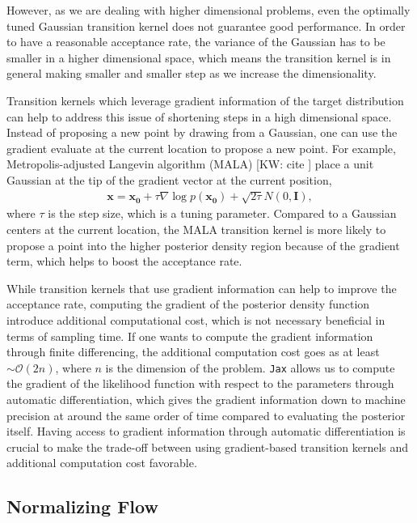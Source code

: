 \documentclass[twocolumn]{aastex631}
\newcommand{\kw}[1]{{\color{rb4}[KW: #1 ]}}
\begin{document}
However, as we are dealing with higher dimensional problems, even the optimally
tuned Gaussian transition kernel does not guarantee good performance. In order
to have a reasonable acceptance rate, the variance of the Gaussian has to be
smaller in a higher dimensional space, which means the transition kernel is in
general making smaller and smaller step as we increase the dimensionality.

Transition kernels which leverage gradient information of the target
distribution can help to address this issue of shortening steps in a high
dimensional space. Instead of proposing a new point by drawing from a Gaussian,
one can use the gradient evaluate at the current location to propose a new
point. For example, Metropolis-adjusted Langevin algorithm (MALA) \kw{cite}
place a unit Gaussian at the tip of the gradient vector at the current position,
\begin{align}
    \mathbf{x} = \mathbf{x_0} + \tau \nabla\log{p(\mathbf{x_0})} + \sqrt{2\tau}N(0,\mathbf{I}),
\end{align}
where $\tau$ is the step size, which is a tuning parameter. Compared to a
Gaussian centers at the current location, the MALA transition kernel is more
likely to propose a point into the higher posterior density region because of
the gradient term, which helps to boost the acceptance rate.

While transition kernels that use gradient information can help to improve the
acceptance rate, computing the gradient of the posterior density function
introduce additional computational cost, which is not necessary beneficial in
terms of sampling time. If one wants to compute the gradient information through
finite differencing, the additional computation cost goes as at least $\sim
\mathcal{O}(2n)$, where $n$ is the dimension of the problem. \texttt{Jax} allows
us to compute the gradient of the likelihood function with respect to the
parameters through automatic differentiation, which gives the gradient
information down to machine precision at around the same order of time compared
to evaluating the posterior itself. Having access to gradient information
through automatic differentiation is crucial to make the trade-off between using
gradient-based transition kernels and additional computation cost favorable.



\subsection{Normalizing Flow}
\label{sec:flow}
\end{document}
